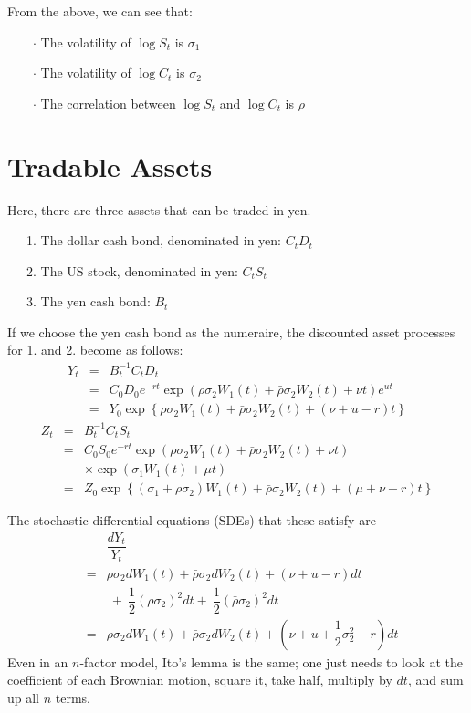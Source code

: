 \documentclass[uplatex,a4j,12pt,dvipdfmx]{jsarticle}
\begin{document}
From the above, we can see that:

\ \ \ \ $\cdot$ The volatility of $\log S_{t}$ is $\sigma_{1}$

\ \ \ \ $\cdot$ The volatility of $\log C_{t}$ is $\sigma_{2}$

\ \ \ \ $\cdot$ The correlation between $\log S_{t}$ and $\log C_{t}$ is $\rho$

\section{Tradable Assets}

Here, there are three assets that can be traded in yen.

\ \ \ 1. The dollar cash bond, denominated in yen: $C_{t} D_{t}$

\ \ \ 2. The US stock, denominated in yen: $C_{t} S_{t}$

\ \ \ 3. The yen cash bond: $B_{t}$

If we choose the yen cash bond as the numeraire, the discounted asset processes for 1. and 2. become as follows:
%
%
\begin{eqnarray*}
	Y_{t}
	&=&
	B^{-1}_{t} C_{t} D_{t}
	\\ &=&
	C_{0} D_{0}
	e^{-rt}
	\exp \left(
	\rho \sigma_{2} W_{1}(t) +
	\bar{\rho} \sigma_{2} W_{2}(t) + \nu t \right)
	e^{ut}
	\\ &=&
	Y_{0}
	\exp \left\{
	\rho \sigma_{2} W_{1}(t) +
	\bar{\rho} \sigma_{2} W_{2}(t) + (\nu + u - r) t \right\}
\end{eqnarray*}
%
%
%
%
\begin{eqnarray*}
	Z_{t}
	&=&
	B^{-1}_{t} C_{t} S_{t}
	\\ &=&
	C_{0} S_{0}
	e^{-rt}
	\exp \left(
	\rho \sigma_{2} W_{1}(t) +
	\bar{\rho} \sigma_{2} W_{2}(t) + \nu t \right)
	\\ && \times
	\exp \left( \sigma_{1} W_{1}(t) + \mu t \right)
	\\ &=&
	Z_{0}
	\exp \left\{
	(\sigma_{1} + \rho \sigma_{2}) W_{1}(t) +
	\bar{\rho} \sigma_{2} W_{2}(t) + ( \mu + \nu - r ) t \right\}
\end{eqnarray*}
%
%

The stochastic differential equations (SDEs) that these satisfy are
%
%
\begin{eqnarray*}
	&&
	\dfrac{dY_{t}}{Y_{t}}
	\\ &=&
	\rho \sigma_{2} dW_{1}(t) +
	\bar{\rho} \sigma_{2} dW_{2}(t) + \left( \nu + u - r \right) dt
	\\ && \
	+ \
	\dfrac{1}{2}(\rho \sigma_{2})^{2} dt
	+ \
	\dfrac{1}{2}(\bar{\rho} \sigma_{2})^{2} dt
	\\ &=&
	\rho \sigma_{2} dW_{1}(t) +
	\bar{\rho} \sigma_{2} dW_{2}(t) + \left( \nu + u + \dfrac{1}{2} \sigma_{2}^{2} - r \right) dt
\end{eqnarray*}
%
%
Even in an $n$-factor model, Ito's lemma is the same; one just needs to look at the coefficient of each Brownian motion, square it, take half, multiply by $dt$, and sum up all $n$ terms.
\end{document}
